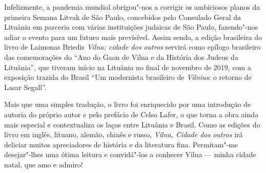 Infelizmente, a pandemia mundial obrigou"-nos a corrigir os ambiciosos
planos da primeira Semana Litvak de São Paulo, concebidos pelo Consulado
Geral da Lituânia em parceria com várias instituições judaicas de São
Paulo, fazendo"-nos adiar o evento para um futuro mais previsível. Assim
sendo, a edição brasileira do livro de Laimonas Briedis \textit{Vilna: cidade
dos outros} servirá como epílogo brasileiro das comemorações do
``Ano do Gaon de Vilna e da História dos Judeus da Lituânia'', que
tiveram início na Lituânia no final de novembro de 2019, com a exposição
trazida do Brasil ``Um modernista brasileiro de \textit{Vilnius}: o retorno de
Lasar Segall''.

Mais que uma simples tradução, o livro foi enriquecido por uma
introdução de autoria do próprio autor e pelo prefácio de Celso Lafer, o
que torna a obra ainda mais especial e contextualiza os laços entre
Lituânia e Brasil. Como as edições do livro em inglês, lituano, alemão,
chinês e russo, \textit{Vilna, Cidade dos outros} irá deliciar muitos
apreciadores de história e da literatura fina. Permitam"-me desejar"-lhes
uma ótima leitura e convidá"-los a conhecer Vilna --- minha cidade natal,
que amo e admiro!

